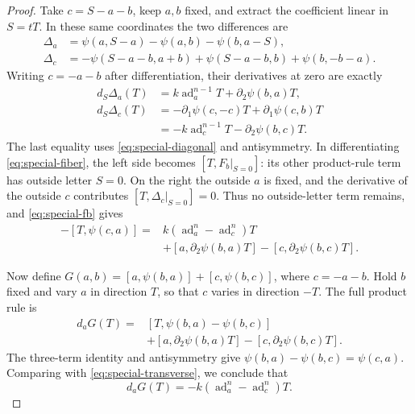 \documentclass[11pt]{article}
\DeclareMathOperator{\ad}{ad}
\theoremstyle{definition}
\theoremstyle{remark}
\numberwithin{equation}{section}
\begin{document}
\begin{proof}
Take \(c=S-a-b\), keep \(a,b\) fixed, and extract the coefficient
linear in \(S=tT\).  In these same coordinates the two differences
are
\begin{align*}
 \Delta_a&=\psi(a,S-a)-\psi(a,b)-\psi(b,a-S),\\
 \Delta_c&=-\psi(S-a-b,a+b)+\psi(S-a-b,b)+\psi(b,-b-a).
\end{align*}
Writing \(c=-a-b\) after differentiation, their derivatives at zero
are exactly
\begin{align*}
 d_S\Delta_a(T)
   &=k\ad_a^{n-1}T+\partial_2\psi(b,a)T,\\
 d_S\Delta_c(T)
   &=-\partial_1\psi(c,-c)T+\partial_1\psi(c,b)T\\
   &=-k\ad_c^{n-1}T-\partial_2\psi(b,c)T.
\end{align*}
The last equality uses \eqref{eq:special-diagonal} and
antisymmetry.  In differentiating \eqref{eq:special-fiber}, the left
side becomes \([T,F_b|_{S=0}]\): its other product-rule term has
outside letter \(S=0\).  On the right the outside \(a\) is fixed,
and the derivative of the outside \(c\) contributes
\([T,\Delta_c|_{S=0}]=0\).  Thus no outside-letter term remains,
and \eqref{eq:special-fb} gives
\begin{equation}\label{eq:special-transverse}
 \begin{split}
 -[T,\psi(c,a)]={}&k(\ad_a^n-\ad_c^n)T\\
 &+[a,\partial_2\psi(b,a)T]
       -[c,\partial_2\psi(b,c)T].
 \end{split}
\end{equation}

Now define
\(G(a,b)=[a,\psi(b,a)]+[c,\psi(b,c)]\), where \(c=-a-b\).
Hold \(b\) fixed and vary \(a\) in direction \(T\), so that \(c\)
varies in direction \(-T\).  The full product rule is
\begin{align*}
 d_aG(T)={}&[T,\psi(b,a)-\psi(b,c)]\\
           &+[a,\partial_2\psi(b,a)T]
              -[c,\partial_2\psi(b,c)T].
\end{align*}
The three-term identity and antisymmetry give
\(\psi(b,a)-\psi(b,c)=\psi(c,a)\).  Comparing with
\eqref{eq:special-transverse}, we conclude that
\begin{equation}\label{eq:special-dg}
 d_aG(T)=-k(\ad_a^n-\ad_c^n)T.
\end{equation}


\end{proof}
\end{document}
